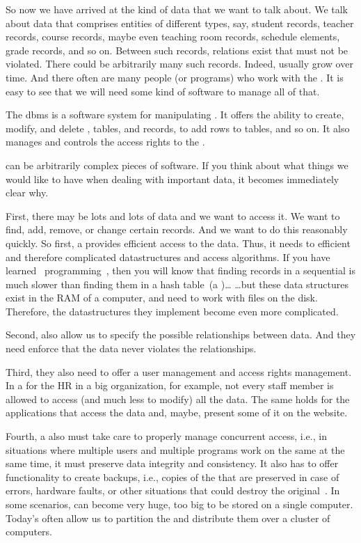 So now we have arrived at the kind of data that we want to talk about.
We talk about data that comprises entities of different types, say, student records, teacher records, course records, maybe even teaching room records, schedule elements, grade records, and so on.
Between such records, relations exist that must not be violated.
There could be arbitrarily many such records.
Indeed,  usually grow over time.
And there often are many people (or programs) who work with the .
It is easy to see that we will need some kind of software to manage all of that.%
%
\begin{definition}%
The \acrfull{dbms} is a software system for manipulating . %
It offers the ability to create, modify, and delete , tables, and records, to add rows to tables, and so on.
It also manages and controls the access rights to the .%
\end{definition}%
%
 can be arbitrarily complex pieces of software.
If you think about what things we would like to have when dealing with important data, it becomes immediately clear why.

First, there may be lots and lots of data and we want to access it.
We want to find, add, remove, or change certain records.
And we want to do this reasonably quickly.
So first, a  provides efficient access to the data.
Thus, it needs to efficient and therefore complicated datastructures and access algorithms.
If you have learned \python\ programming~\cite{programmingWithPython}, then you will know that finding records in a sequential  is much slower than finding them in a hash table~(a )\dots
{\dots}but these data structures exist in the RAM of a computer, and  need to work with files on the disk.
Therefore, the datastructures they implement become even more complicated.

Second,  also allow us to specify the possible relationships between data.
And they need enforce that the data never violates the relationships.

Third, they also need to offer a user management and access rights management.
In a  for the \acrfull{HR} in a big organization, for example, not every  staff member is allowed to access (and much less to modify) all the data.
The same holds for the applications that access the data and, maybe, present some of it on the website.

Fourth, a  also must take care to properly manage concurrent access, i.e., in situations where multiple users and multiple programs work on the same  at the same time, it must preserve data integrity and consistency.
It also has to offer functionality to create backups, i.e., copies of the  that are preserved in case of errors, hardware faults, or other situations that could destroy the original~.
In some scenarios,  can become very huge, too big to be stored on a single computer.
Today's  often allow us to partition the  and distribute them over a cluster of computers.

